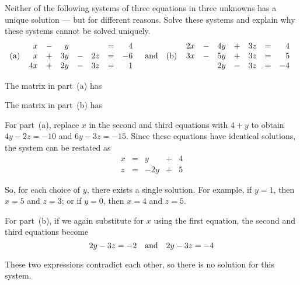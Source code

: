 \documentclass{ximera}
\begin{document}
\begin{exercise} \label{c2.1.9}
Neither of the following systems of three equations in three
unknowns has a unique solution --- but for different
reasons.  Solve these systems and explain why these systems
cannot be solved uniquely.
\[
\mbox{(a) }\; \begin{array}{rcrcrcr}
  x & - &  y &   &    & = &  4\\
  x & + & 3y & - & 2z & = & -6\\
 4x & + & 2y & - & 3z & = &  1
\end{array} \quad\mbox{and}\quad
\mbox{(b) }\; \begin{array}{rcrcrcr}
 2x & - & 4y & + & 3z & = &  4\\
 3x & - & 5y & + & 3z & = &  5\\
    &   & 2y & - & 3z & = & -4
\end{array}
\]
\begin{prompt}
  The matrix in part~(a) has
  \begin{multipleChoice}
  \end{multipleChoice}

  The matrix in part~(b) has
  \begin{multipleChoice}
  \end{multipleChoice}
\end{prompt}

\begin{hint}
For part~(a), replace $x$ in the second and third equations with
$4 + y$ to obtain $4y - 2z = -10$ and $6y - 3z = -15$.  Since these
equations have identical solutions, the system can be restated as
\[
\begin{array}{rrrrrrr}
x & = & y & + & 4 \\ 
z & = & -2y & + & 5\end{array}
\]
\end{hint}
\begin{hint}
So, for each choice of $y$, there exists a single solution.  For
example, if $y = 1$, then $x = 5$ and $z = 3$; or if $y = 0$, then
$x = 4$ and $z = 5$.  
\end{hint}
\begin{hint}
For part~(b), if we again substitute for $x$ using the first equation, the
second and third equations become
\[
2y - 3z = -2 \quad\mbox{and}\quad 2y - 3z = -4
\]
\end{hint}
\begin{hint}
These two expressions contradict each other, so there is no solution
for this system.  
\end{hint}
\end{exercise}
\end{document}
